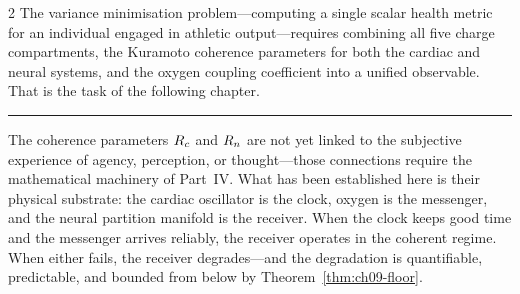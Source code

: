 \begin{multicols}{2}
The variance minimisation problem---computing a single scalar health
metric for an individual engaged in athletic output---requires combining
all five charge compartments, the Kuramoto coherence parameters for
both the cardiac and neural systems, and the oxygen coupling coefficient
into a unified observable. That is the task of the following chapter.

\vspace{1em}
\begin{center}
\rule{0.4\columnwidth}{0.4pt}
\end{center}
\vspace{0.5em}

\noindent The coherence parameters $R_c$ and $R_n$ are not yet linked
to the subjective experience of agency, perception, or thought---those
connections require the mathematical machinery of Part~IV. What has been
established here is their physical substrate: the cardiac oscillator is
the clock, oxygen is the messenger, and the neural partition manifold
is the receiver. When the clock keeps good time and the messenger
arrives reliably, the receiver operates in the coherent regime. When
either fails, the receiver degrades---and the degradation is
quantifiable, predictable, and bounded from below by
Theorem~\ref{thm:ch09-floor}.

\end{multicols}
